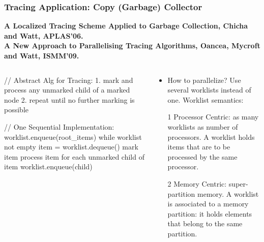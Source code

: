 \documentclass{beamer}
\newcommand{\emp}[1]{\textcolor{DikuRed}{ #1}}
\begin{document}
\begin{frame}[fragile,t]
  \frametitle{Tracing Application: Copy (Garbage) Collector}

{\bf A Localized Tracing Scheme Applied to Garbage Collection, Chicha and Watt, APLAS'06.}\\
{\bf A New Approach to Parallelising Tracing Algorithms, Oancea, Mycroft and Watt, ISMM'09.}

\begin{columns}
\begin{colorcode}
\emp{// Abstract Alg for Tracing:}
1. mark and process any unmarked 
          child of a marked node
2. repeat until no further marking
                     is possible

\emp{// One Sequential Implementation:}
worklist.enqueue(root_items)
while worklist not empty
  item = worklist.dequeue()
  mark    item
  process item
  for each unmarked child of item 
      worklist.enqueue(child)
\end{colorcode}
\begin{scriptsize}
\begin{itemize}\pause
    \item \emp{How to parallelize?} Use several worklists
            instead of one. Worklist semantics: 
    \item[1] \emp{Processor Centric}: as many worklists
            as number of processors. A worklist holds
            items that are to be processed by the same
            processor. 
    \item[2] \emp{Memory Centric}: super-partition memory.
            A worklist is associated to a memory partition:
            it holds elements that belong to the same partition.
\end{itemize}
\end{scriptsize}
\end{columns}

\end{frame}
\end{document}

